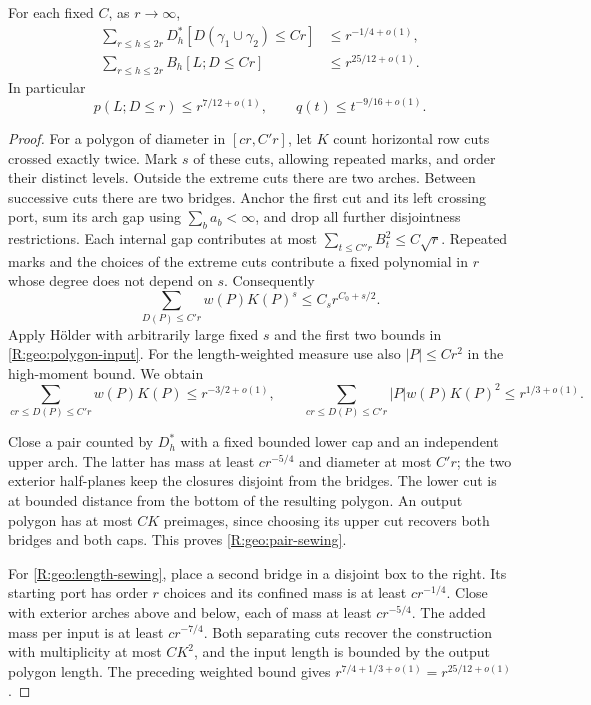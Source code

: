 \begin{lemma}\label{R:geo:polygon-sewing}
For each fixed $C$, as $r\to\infty$,
\begin{align}
 \sum_{r\le h\le2r}D_h^*[D(\gamma_1\cup\gamma_2)\le Cr]
       &\le r^{-1/4+o(1)},\label{R:geo:pair-sewing}\\
 \sum_{r\le h\le2r}B_h[L;D\le Cr]
       &\le r^{25/12+o(1)}.\label{R:geo:length-sewing}
\end{align}
In particular
\begin{equation}\label{R:geo:truncated-reward}
 p(L;D\le r)\le r^{7/12+o(1)},\qquad
 q(t)\le t^{-9/16+o(1)}.
\end{equation}
\end{lemma}
\begin{proof}
For a polygon of diameter in $[c r,C'r]$, let $K$ count horizontal row
cuts crossed exactly twice.  Mark $s$ of these cuts, allowing repeated
marks, and order their distinct levels.  Outside the extreme cuts
there are two arches.  Between successive cuts there are two bridges.
Anchor the first cut and its left crossing port, sum its arch gap using
$\sum_b a_b<\infty$, and drop all further disjointness restrictions.
Each internal gap contributes at most
$\sum_{t\le C''r}B_t^2\le C\sqrt r$.  Repeated marks and the choices
of the extreme cuts contribute a fixed polynomial in $r$ whose degree
does not depend on $s$.  Consequently
\[
       \sum_{D(P)\le C'r}w(P)K(P)^s\le C_s r^{C_0+s/2}.
\]
Apply H\"older with arbitrarily large fixed $s$ and the first two
bounds in \eqref{R:geo:polygon-input}.  For the length-weighted measure
use also $|P|\le C r^2$ in the high-moment bound.  We obtain
\[
 \sum_{c r\le D(P)\le C'r}w(P)K(P)\le r^{-3/2+o(1)},\qquad
 \sum_{c r\le D(P)\le C'r}|P|w(P)K(P)^2\le r^{1/3+o(1)}.
\]

Close a pair counted by $D_h^*$ with a fixed bounded lower cap and an
independent upper arch.  The latter has mass at least $c r^{-5/4}$
and diameter at most $C'r$; the two exterior half-planes keep the
closures disjoint from the bridges.  The lower cut is at bounded
distance from the bottom of the resulting polygon.  An output polygon
has at most $C K$ preimages, since choosing its upper cut recovers both
bridges and both caps.  This proves \eqref{R:geo:pair-sewing}.

For \eqref{R:geo:length-sewing}, place a second bridge in a disjoint
box to the right.  Its starting port has order $r$ choices and its
confined mass is at least $c r^{-1/4}$.  Close with exterior arches
above and below, each of mass at least $c r^{-5/4}$.  The added mass
per input is at least $c r^{-7/4}$.  Both separating cuts recover the
construction with multiplicity at most $C K^2$, and the input length
is bounded by the output polygon length.  The preceding weighted
bound gives $r^{7/4+1/3+o(1)}=r^{25/12+o(1)}$.


\end{proof}
